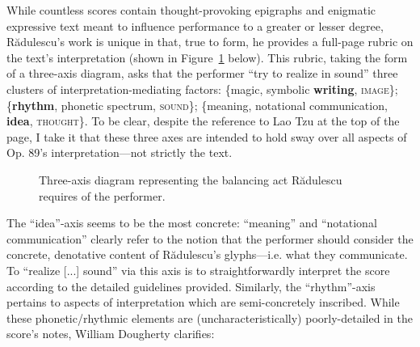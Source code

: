     
        While countless scores contain thought-provoking epigraphs and enigmatic expressive text meant to influence performance to a greater or lesser degree, R\u{a}dulescu's work is unique in that, true to form, he provides a full-page rubric on the text's interpretation (shown in Figure~\ref{fig:radulescu_triaxial} below). This rubric, taking the form of a three-axis diagram, asks that the performer ``try to realize in sound'' three clusters of interpretation-mediating factors: \{magic, symbolic \textbf{writing}, \textsc{image}\}; \{\textbf{rhythm}, phonetic spectrum, \textsc{sound}\}; \{meaning, notational communication, \textbf{idea}, \textsc{thought}\}. To be clear, despite the reference to Lao Tzu at the top of the page, I take it that these three axes are intended to hold sway over all aspects of Op. 89's interpretation---not strictly the text.
        
        \begin{figure} 
            \centering
            \captionsetup{width=.5\textwidth}
            \caption[Three-axis diagram representing the balancing act Rădulescu requires of the performer.]{Three-axis diagram representing the balancing act Rădulescu requires of the performer.\footnotemark}
            \label{fig:radulescu_triaxial}
        \end{figure}
            
        The ``idea''-axis seems to be the most concrete: ``meaning'' and ``notational communication'' clearly refer to the notion that the performer should consider the concrete, denotative content of R\u{a}dulescu's glyphs---i.e. what they communicate. To ``realize [...] sound'' via this axis is to straightforwardly interpret the score according to the detailed guidelines provided. Similarly, the ``rhythm''-axis pertains to aspects of interpretation which are semi-concretely inscribed. While these phonetic/rhythmic elements are (uncharacteristically) poorly-detailed in the score's notes, William Dougherty clarifies:


